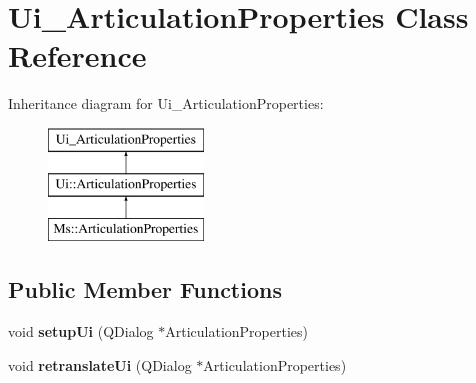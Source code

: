 \hypertarget{class_ui___articulation_properties}{}\section{Ui\+\_\+\+Articulation\+Properties Class Reference}
\label{class_ui___articulation_properties}
Inheritance diagram for Ui\+\_\+\+Articulation\+Properties\+:\begin{figure}[H]
\begin{center}
\leavevmode
\includegraphics[height=3.000000cm]{class_ui___articulation_properties}
\end{center}
\end{figure}
\subsection*{Public Member Functions}
\begin{DoxyCompactItemize}
\item 
\mbox{\label{class_ui___articulation_properties_ae7d5582ba7cfe059c5005dd05c438ae1}} 
void {\bfseries setup\+Ui} (Q\+Dialog $\ast$Articulation\+Properties)
\item 
\mbox{\label{class_ui___articulation_properties_ab6df4817dabe6c943c254dbfe870b5f3}} 
void {\bfseries retranslate\+Ui} (Q\+Dialog $\ast$Articulation\+Properties)
\end{DoxyCompactItemize}
